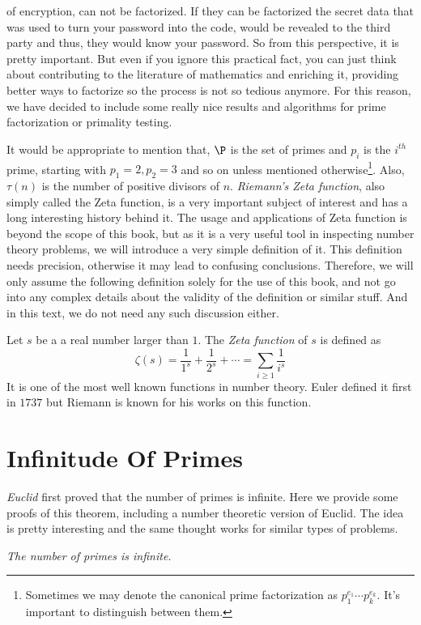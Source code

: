 \documentclass{subfiles}
\begin{document}
of encryption, can not be factorized. If they can be factorized the secret data that was used to turn your password into the code, would be revealed to the third party and thus, they would know your password. So from this perspective, it is pretty important. But even if you ignore this practical fact, you can just think about contributing to the literature of mathematics and enriching it, providing better ways to factorize so the process is not so tedious anymore. For this reason, we have decided to include some really nice results and algorithms for prime factorization or primality testing.

	It would be appropriate to mention that, $\P $ is the set of primes and $p_i$ is the $i^{th}$ prime, starting with $p_1=2,p_2=3$ and so on unless mentioned otherwise\footnote{Sometimes we may denote the canonical prime factorization as $p_1^{e_1}\cdots p_k^{e_k}$. It's important to distinguish between them.}. Also, $\tau(n)$ is the number of positive divisors of $n$. \textit{Riemann's Zeta function}, also simply called the Zeta function, is a very important subject of interest and has a long interesting history behind it. The usage and applications of Zeta function is beyond the scope of this book, but as it is a very useful tool in inspecting number theory problems, we will introduce a very simple definition of it. This definition needs precision, otherwise it may lead to confusing conclusions. Therefore, we will only assume the following definition solely for the use of this book, and not go into any complex details about the validity of the definition or similar stuff. And in this text, we do not need any such discussion either.
		\begin{definition}
			Let $s$ be a a real number larger than $1$. The \textit{Zeta function} of $s$ is defined as
			\[\zeta(s)=\dfrac{1}{1^s}+\dfrac{1}{2^s}+\cdots=\sum_{i\geq1}\dfrac{1}{i^s}\]
			It is one of the most well known functions in number theory. Euler defined it first in $1737$ but Riemann is known for his works on this function.
		\end{definition}
	\section{Infinitude Of Primes}
	\label{sec:infiniteprimes}
	\textit{Euclid} first proved that the number of primes is infinite. Here we provide some proofs of this theorem, including a number theoretic version of Euclid. The idea is pretty interesting and the same thought works for similar types of problems.
		\begin{theorem}\sl
			The number of primes is infinite.
		\end{theorem}
\end{document}
